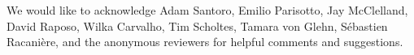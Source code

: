 \documentclass{article}
\begin{document}
\begin{ack}
We would like to acknowledge Adam Santoro, Emilio Parisotto, Jay McClelland, David Raposo, Wilka Carvalho, Tim Scholtes, Tamara von Glehn, S\'{e}bastien Racani\`{e}re, and the anonymous reviewers for helpful comments and suggestions.
\end{ack}





\end{document}
